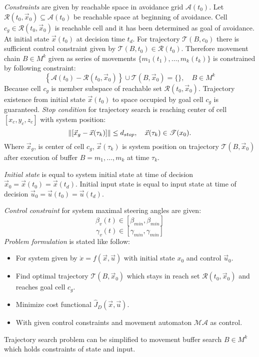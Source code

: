 \noindent\textit{Constraints} are given by reachable space in avoidance grid $\mathscr{A}(t_0)$. Let $\mathscr{R}(t_0,\vec{x}_0)\subseteq \mathscr{A}(t_0)$ be reachable space at beginning of avoidance. Cell $c_g\in\mathscr{R}(t_0,\vec{x}_{0})$ is reachable cell and it has been determined as goal of avoidance. At initial state $\vec{x}(t_0)$ at decision time $t_d$. For trajectory $\mathscr{T}(B,c_0)$ there is sufficient control constraint given by $\mathscr{T}(B,t_0)\in \mathscr{R}(t_0)$. Therefore movement chain $B\in M^k$ given as series of movements $\{m_1(t_1),\dots,m_k(t_k)\}$ is constrained by following constraint:
\begin{equation}
    \left\{\mathscr{A}(t_0)-\mathscr{R}(t_0,\vec{x}_0)\right\} \cup \mathscr{T}(B,\vec{x}_0) = \{\},\quad B\in M^k
\end{equation}
\noindent Because cell $c_g$ is member subspace of reachable set $\mathscr{R}(t_0,\vec{x}_0)$. Trajectory existence from initial state $\vec{x}(t_0)$ to space occupied by goal cell $c_g$ is guaranteed.
\textit{Stop condition} for trajectory search is reaching center of cell $[x_c,y_c,z_c]$ with system position:
\begin{equation}
    \left\lVert[\vec{x}_g - \vec{x}(\tau_k)]\right\rVert \le d_{stop},\quad \vec{x}(\tau_k)\in\mathscr{T}(x_0).
\end{equation}
Where $\vec{x}_g$, is center of cell $c_g$, $\vec{x}(\tau_k)$ is system position on trajectory $\mathscr{T}(B,\vec{x}_0)$ after execution of buffer $B={m_1,\dots,m_k}$ at time $\tau_k$.

\textit{Initial state} is equal to system initial state at time of decision $\vec{x}_0=\vec{x}(t_0)=\vec{x}(t_d)$. Initial input state is equal to input state at time of decision $\vec{u}_0=\vec{u}(t_0)=\vec{u}(t_d)$.

\textit{Control constraint} for system maximal steering angles are given: 
\begin{equation}
    \beta_v(t)\in [\beta_{min},\beta_{min}]    
\end{equation}
\begin{equation}
    \gamma_v(t)\in [\gamma_{min},\gamma_{min}]    
\end{equation}
\newpage\noindent \textit{Problem formulation} is stated like follow:
\begin{itemize}
    \item For system given by $\dot{x} = f(\vec{x},\vec{u})$ with initial state $x_0$ and control $\vec{u}_0$.
    \item Find optimal trajectory $\mathscr{T}(B,\vec{x}_0)$ which stays in reach set $\mathscr{R}(t_0,\vec{x}_0)$ and reaches goal cell $c_g$.
    \item Minimize cost functional $\hat{J}_D(\vec{x},\vec{u})$.
    \item With given control constraints and movement automaton $\mathscr{MA}$ as control.
\end{itemize}
Trajectory search problem can be simplified to movement buffer search $B\in M^k$ which holds constraints of state and input. 

